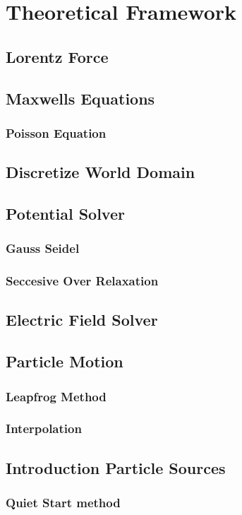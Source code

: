 \chapter{Theoretical Framework}


\section{Lorentz Force}

\section{Maxwells Equations}

\subsection{Poisson Equation}

\section{Discretize World Domain}

\section{Potential Solver}

\subsection{Gauss Seidel}

\subsection{Seccesive Over Relaxation}

\section{Electric Field Solver}

\section{Particle Motion}

\subsection{Leapfrog Method}

\subsection{Interpolation}

\section{Introduction Particle Sources}

\subsection{Quiet Start method}

